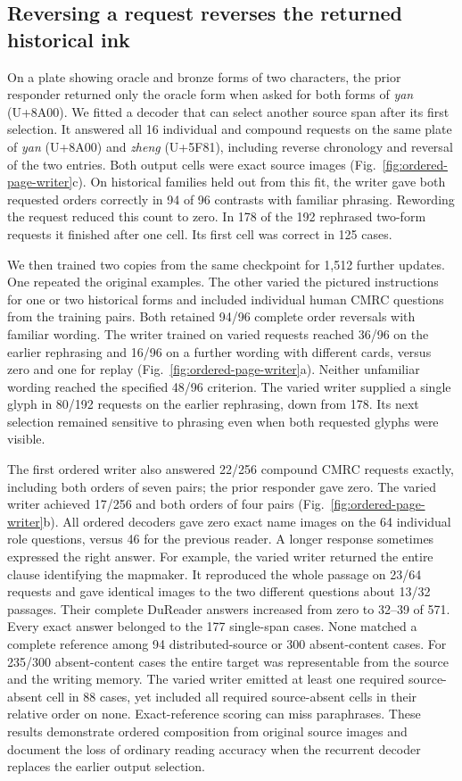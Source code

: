 \subsection*{Reversing a request reverses the returned historical ink}
On a plate showing oracle and bronze forms of two characters, the prior responder returned only the oracle form when asked for both forms of \textit{yan} (U+8A00). We fitted a decoder that can select another source span after its first selection. It answered all 16 individual and compound requests on the same plate of \textit{yan} (U+8A00) and \textit{zheng} (U+5F81), including reverse chronology and reversal of the two entries. Both output cells were exact source images (Fig.~\ref{fig:ordered-page-writer}c). On historical families held out from this fit, the writer gave both requested orders correctly in 94 of 96 contrasts with familiar phrasing. Rewording the request reduced this count to zero. In 178 of the 192 rephrased two-form requests it finished after one cell. Its first cell was correct in 125 cases.

We then trained two copies from the same checkpoint for 1,512 further updates. One repeated the original examples. The other varied the pictured instructions for one or two historical forms and included individual human CMRC questions from the training pairs. Both retained 94/96 complete order reversals with familiar wording. The writer trained on varied requests reached 36/96 on the earlier rephrasing and 16/96 on a further wording with different cards, versus zero and one for replay (Fig.~\ref{fig:ordered-page-writer}a). Neither unfamiliar wording reached the specified 48/96 criterion. The varied writer supplied a single glyph in 80/192 requests on the earlier rephrasing, down from 178. Its next selection remained sensitive to phrasing even when both requested glyphs were visible.

The first ordered writer also answered 22/256 compound CMRC requests exactly, including both orders of seven pairs; the prior responder gave zero. The varied writer achieved 17/256 and both orders of four pairs (Fig.~\ref{fig:ordered-page-writer}b). All ordered decoders gave zero exact name images on the 64 individual role questions, versus 46 for the previous reader. A longer response sometimes expressed the right answer. For example, the varied writer returned the entire clause identifying the mapmaker. It reproduced the whole passage on 23/64 requests and gave identical images to the two different questions about 13/32 passages. Their complete DuReader answers increased from zero to 32--39 of 571. Every exact answer belonged to the 177 single-span cases. None matched a complete reference among 94 distributed-source or 300 absent-content cases. For 235/300 absent-content cases the entire target was representable from the source and the writing memory. The varied writer emitted at least one required source-absent cell in 88 cases, yet included all required source-absent cells in their relative order on none. Exact-reference scoring can miss paraphrases. These results demonstrate ordered composition from original source images and document the loss of ordinary reading accuracy when the recurrent decoder replaces the earlier output selection.
